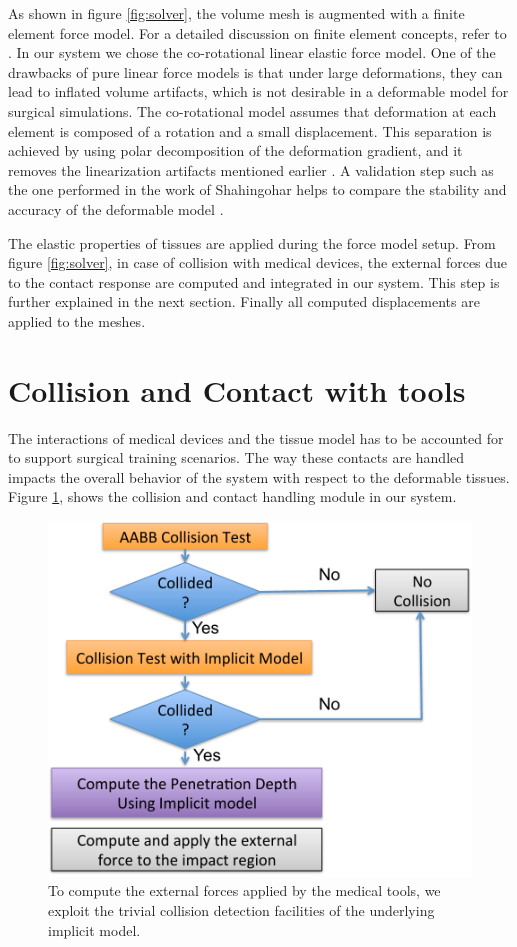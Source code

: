 As shown in figure \ref{fig:solver}, the volume mesh is augmented with a finite element force model. 
For a detailed discussion on finite element concepts, refer to \cite{bathe1996finite}. In our system we 
chose the co-rotational linear elastic force model. One of the drawbacks of pure linear force models is that under 
large deformations, they can lead to inflated volume artifacts, which is not desirable in a 
deformable model for surgical simulations. The co-rotational model assumes that deformation at each 
element is composed of a rotation and a small displacement. This separation is achieved by using polar 
decomposition of the deformation gradient, and it removes the linearization artifacts mentioned 
earlier \cite{bathe1996finite}. A validation step such as the one performed in the work of Shahingohar \etal
helps to compare the stability and accuracy of the deformable model \cite{Shahingohar2011}. 


The elastic properties of tissues are applied during the force model setup. From 
figure \ref{fig:solver}, in case of collision with medical devices, the external 
forces due to the contact response are computed and integrated in our system. This step is further explained
in the next section. Finally all computed displacements are applied to the meshes. 


\section{Collision and Contact with tools}
\label{sec:collisionsandcontacts}
The interactions of medical devices and the tissue model has to be accounted for to support surgical 
training scenarios. The way these contacts are handled impacts the overall behavior of the system with 
respect to the deformable tissues. Figure \ref{fig:contact}, shows the collision and contact handling 
module in our system.

\begin{figure}[H]
  \centering
  \includegraphics[width=0.8\linewidth]{figures/deformable/contact.pdf}
  \caption{\label{fig:contact}
  {To compute the external forces applied by the medical tools, we exploit the trivial collision detection 
  facilities of the underlying implicit model.}
}
\end{figure}

